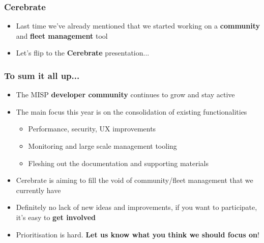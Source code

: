 \begin{frame}
\frametitle{Cerebrate}
\begin{itemize}
        \item Last time we've already mentioned that we started working on a {\bf community} and {\bf fleet management} tool
	\item Let's flip to the {\bf Cerebrate} presentation...
\end{itemize}
\end{frame}

\begin{frame}
  \frametitle{To sum it all up...}
  \begin{itemize}
     \item The MISP {\bf developer community} continues to grow and stay active
     \item The main focus this year is on the consolidation of existing functionalities
     \begin{itemize}
          \item Performance, security, UX improvements
          \item Monitoring and large scale management tooling
          \item Fleshing out the documentation and supporting materials
     \end{itemize}
     \item Cerebrate is aiming to fill the void of community/fleet management that we currently have
     \item Definitely no lack of new ideas and improvements, if you want to participate, it's easy to {\bf get involved}
     \item Prioritisation is hard. {\bf Let us know what you think we should focus on}!
  \end{itemize}
\end{frame}

